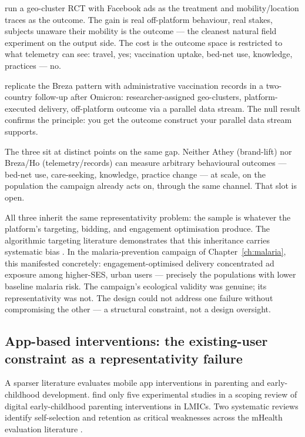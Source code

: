 \citet{Breza2021} run a geo-cluster RCT with Facebook ads as the treatment and mobility/location traces as the outcome. The gain is real off-platform behaviour, real stakes, subjects unaware their mobility is the outcome --- the cleanest natural field experiment on the output side. The cost is the outcome space is restricted to what telemetry can see: travel, yes; vaccination uptake, bed-net use, knowledge, practices --- no.

\citet{Ho2023} replicate the Breza pattern with administrative vaccination records in a two-country follow-up after Omicron: researcher-assigned geo-clusters, platform-executed delivery, off-platform outcome via a parallel data stream. The null result confirms the principle: you get the outcome construct your parallel data stream supports.

The three sit at distinct points on the same gap. Neither Athey (brand-lift) nor Breza/Ho (telemetry/records) can measure arbitrary behavioural outcomes --- bed-net use, care-seeking, knowledge, practice change --- at scale, on the population the campaign already acts on, through the same channel. That slot is open.

All three inherit the same representativity problem: the sample is whatever the platform's targeting, bidding, and engagement optimisation produce. The algorithmic targeting literature demonstrates that this inheritance carries systematic bias \citep{Ali2019,Boegershausen2025,Koenecke2023}. In the malaria-prevention campaign of Chapter~\ref{ch:malaria}, this manifested concretely: engagement-optimised delivery concentrated ad exposure among higher-SES, urban users --- precisely the populations with lower baseline malaria risk. The campaign's ecological validity was genuine; its representativity was not. The design could not address one failure without compromising the other --- a structural constraint, not a design oversight.

\subsection{App-based interventions: the existing-user constraint as a representativity failure}
\label{sec:intro:apps}

A sparser literature evaluates mobile app interventions in parenting and early-childhood development. \citet{Jaggi2025} find only five experimental studies in a scoping review of digital early-childhood parenting interventions in LMICs. Two systematic reviews identify self-selection and retention as critical weaknesses across the mHealth evaluation literature \citep{Sapanel2023,Bremer2023}.

